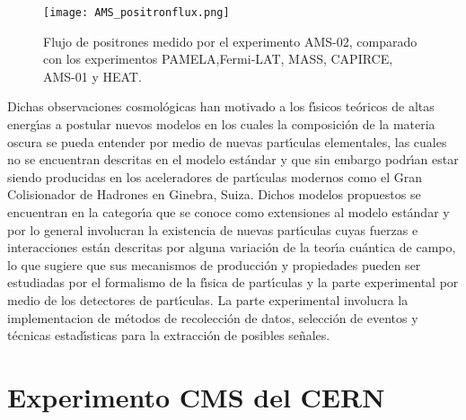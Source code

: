 \begin{figure}
\begin{center}
 \texttt{[image: AMS\_positronflux.png]}
  \caption{Flujo de positrones medido por el experimento AMS-02, comparado con los experimentos PAMELA,Fermi-LAT, MASS, CAPIRCE, AMS-01 y HEAT.}
 \label{fig:AMS_positron}
 \end{center}
\end{figure}

Dichas observaciones cosmol\'ogicas han motivado a los f\'{\i}sicos te\'oricos de altas energ\'{\i}as a postular nuevos modelos en los cuales la composici\'on de la materia oscura se pueda entender por medio de nuevas part\'{\i}culas elementales, las cuales no se encuentran descritas en el modelo est\'andar y que sin embargo podr\'{\i}an estar siendo producidas en los aceleradores de part\'{\i}culas modernos como el Gran Colisionador de Hadrones en Ginebra, Suiza.  Dichos modelos propuestos se encuentran en la categor\'{\i}a que se conoce como extensiones al modelo est\'andar y por lo general involucran la existencia de nuevas part\'{\i}culas cuyas fuerzas e interacciones est\'an descritas por alguna variaci\'on de la teor\'{\i}a cu\'antica de campo, lo que sugiere que sus mecanismos de producci\'on y propiedades pueden ser estudiadas por el formalismo de la f\'{\i}sica de part\'{\i}culas y la parte experimental por medio de los detectores de part\'{\i}culas. La parte experimental involucra la implementacion de m\'etodos de recolecci\'on de datos, selecci\'on de eventos y t\'ecnicas estad\'{\i}sticas para la extracci\'on de posibles se\~nales.

\section{Experimento CMS del CERN}
\label{cap:cms}

